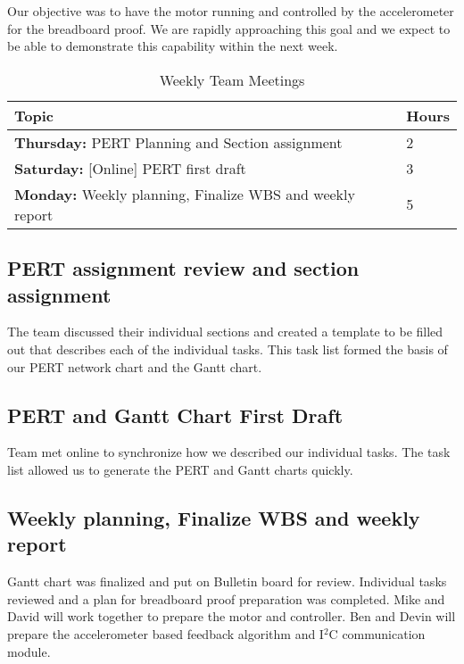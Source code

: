 \documentclass[12pt,compsoc]{IEEEtran}
\begin{document}
			Our objective was to have the motor running and controlled by the accelerometer for the 
		breadboard proof. We are rapidly approaching this goal and we expect to be able to demonstrate 
		this capability within the next week.
	
	\begin{table}[ht]
		\renewcommand{\arraystretch}{1.3}
		\caption{Weekly Team Meetings}
		
		\label{Weekly Team Meetings}
		
		\centering
		\begin{tabular}{p{6.5cm}|p{1cm}}
		\hline
		{\bfseries 	Topic} 																	&{\bfseries Hours}		\\
		\hline\hline	
					{\bfseries Thursday:} PERT Planning and Section assignment				& 2	 					\\
					{\bfseries Saturday:} [Online] PERT first draft							& 3						\\
					{\bfseries Monday:} Weekly planning, Finalize WBS and weekly report		& 5	 					\\

		\hline
		\end{tabular}
	\end{table}
				
	\subsection{PERT assignment review and section assignment}
		The team discussed their individual sections and created a template to be filled out that describes each
		of the individual tasks. This task list formed the basis of our PERT network chart and the Gantt chart.

	\subsection{PERT and Gantt Chart First Draft}
		Team met online to synchronize how we described our individual tasks. The task list allowed us to generate
		the PERT and Gantt charts quickly.

		\subsection{Weekly planning, Finalize WBS and weekly report}
		Gantt chart was finalized and put on Bulletin board for review. Individual tasks reviewed and a plan for 
		breadboard proof preparation was completed. Mike and David will work together to prepare the motor and
		controller. Ben and Devin will prepare the accelerometer based feedback algorithm and I$^2$C communication
		module.
\end{document}
